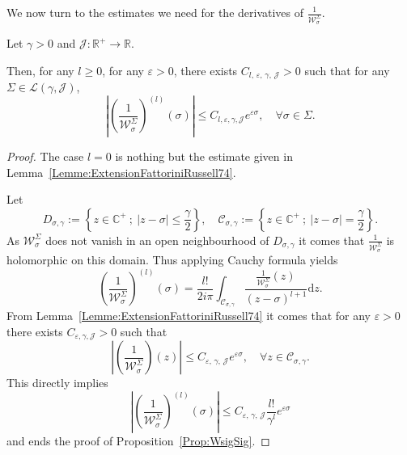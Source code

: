 \documentclass[10pt]{amsart}
\theoremstyle{definition}\newtheorem{defi}[theo]{Definition}\newtheorem{rema}[theo]{Remark}\newtheorem{exam}[theo]{Example}\newtheorem{exem}[theo]{Example}\newtheorem{nota}[theo]{Notation}
\newcommand{\R}{\mathbb{R}}
\newcommand{\C}{\mathbb{C}}
\newcommand{\md}{\mathrm{d}}
\let\oldforall\forall
\renewcommand*{\forall}{\mathrel{\oldforall}}
\begin{document}
We now turn to the estimates we need for the derivatives of $\frac{1}{\mathcal{W}^{\Sigma}_{\sigma}}$.

\begin{prop}\label{Prop:WsigSig}
Let $\gamma >0$ and $\mathcal{J} : \R^+ \to \R$.

Then, for any $l \geq 0$, for any $\varepsilon >0$, there exists $C_{l,\,\varepsilon,\,\gamma,\,\mathcal{J}}>0$ such that for any $\Sigma \in \mathcal{L}(\gamma, \mathcal{J})$,
\[
\left| \left(\frac{1}{\mathcal{W}^\Sigma_{\sigma}} \right)^{(l)} (\sigma) \right| \leq C_{l,\varepsilon, \gamma, \mathcal{J}} e^{\varepsilon \sigma}, \quad \forall \sigma \in \Sigma.
\]
\end{prop}

\begin{proof}
The case $l=0$ is nothing but the estimate given in Lemma~\ref{Lemme:ExtensionFattoriniRussell74}.

Let
\[
D_{\sigma,\gamma} := \left\{ z \in \C^+ \: ; \: |z-\sigma| \leq \frac{\gamma}{2} \right\},
\quad
\mathcal{C}_{\sigma,\gamma} := \left\{ z \in \C^+ \: ; \: |z-\sigma| = \frac{\gamma}{2} \right\}.
\]
As $\mathcal{W}^{\Sigma}_\sigma$ does not vanish in an open neighbourhood of $D_{\sigma, \gamma}$ it comes that $\frac{1}{\mathcal{W}^{\Sigma}_\sigma}$ is holomorphic on this domain. Thus applying Cauchy formula yields
\[
\left(\frac{1}{\mathcal{W}^\Sigma_\sigma} \right)^{(l)} (\sigma) = \frac{l!}{2i\pi} \int_{\mathcal{C}_{\sigma,\gamma}} \frac{\frac{1}{\mathcal{W}^\Sigma_\sigma}(z)}{(z-\sigma)^{l+1}} \md z.
\]
From Lemma~\ref{Lemme:ExtensionFattoriniRussell74} it comes that for any $\varepsilon>0$ there exists $C_{\varepsilon, \gamma, \mathcal{J}}>0$ such that
\[
\left| \left(\frac{1}{\mathcal{W}^\Sigma_\sigma} \right)(z) \right| \leq C_{\varepsilon,\,\gamma,\,\mathcal{J}} e^{\varepsilon \sigma}, \quad\forall z\in \mathcal{C}_{\sigma,\gamma}.
\]
This directly implies
\[
\left| \left(\frac{1}{\mathcal{W}^\Sigma_\sigma} \right)^{(l)}(\sigma) \right| \leq C_{\varepsilon,\,\gamma,\,\mathcal{J}} \frac{l!}{\gamma^l} e^{\varepsilon \sigma}
\]
and ends the proof of Proposition~\ref{Prop:WsigSig}.
\end{proof}
\end{document}
